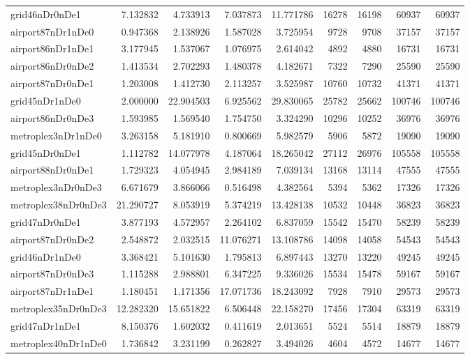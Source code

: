\begin{longtable}{|l|r|r|r|r|r|r|r|r|}
grid46nDr0nDe1 & 7.132832 & 4.733913 & 7.037873 & 11.771786 & 16278 & 16198 & 60937 & 60937 \\
airport87nDr1nDe0 & 0.947368 & 2.138926 & 1.587028 & 3.725954 & 9728 & 9708 & 37157 & 37157 \\
airport86nDr1nDe1 & 3.177945 & 1.537067 & 1.076975 & 2.614042 & 4892 & 4880 & 16731 & 16731 \\
airport86nDr0nDe2 & 1.413534 & 2.702293 & 1.480378 & 4.182671 & 7322 & 7290 & 25590 & 25590 \\
airport87nDr0nDe1 & 1.203008 & 1.412730 & 2.113257 & 3.525987 & 10760 & 10732 & 41371 & 41371 \\
grid45nDr1nDe0 & 2.000000 & 22.904503 & 6.925562 & 29.830065 & 25782 & 25662 & 100746 & 100746 \\
airport86nDr0nDe3 & 1.593985 & 1.569540 & 1.754750 & 3.324290 & 10296 & 10252 & 36976 & 36976 \\
metroplex3nDr1nDe0 & 3.263158 & 5.181910 & 0.800669 & 5.982579 & 5906 & 5872 & 19090 & 19090 \\
grid45nDr0nDe1 & 1.112782 & 14.077978 & 4.187064 & 18.265042 & 27112 & 26976 & 105558 & 105558 \\
airport88nDr0nDe1 & 1.729323 & 4.054945 & 2.984189 & 7.039134 & 13168 & 13114 & 47555 & 47555 \\
metroplex3nDr0nDe3 & 6.671679 & 3.866066 & 0.516498 & 4.382564 & 5394 & 5362 & 17326 & 17326 \\
metroplex38nDr0nDe3 & 21.290727 & 8.053919 & 5.374219 & 13.428138 & 10532 & 10448 & 36823 & 36823 \\
grid47nDr0nDe1 & 3.877193 & 4.572957 & 2.264102 & 6.837059 & 15542 & 15470 & 58239 & 58239 \\
airport87nDr0nDe2 & 2.548872 & 2.032515 & 11.076271 & 13.108786 & 14098 & 14058 & 54543 & 54543 \\
grid46nDr1nDe0 & 3.368421 & 5.101630 & 1.795813 & 6.897443 & 13270 & 13220 & 49245 & 49245 \\
airport87nDr0nDe3 & 1.115288 & 2.988801 & 6.347225 & 9.336026 & 15534 & 15478 & 59167 & 59167 \\
airport87nDr1nDe1 & 1.180451 & 1.171356 & 17.071736 & 18.243092 & 7928 & 7910 & 29573 & 29573 \\
metroplex35nDr0nDe3 & 12.282320 & 15.651822 & 6.506448 & 22.158270 & 17456 & 17304 & 63319 & 63319 \\
grid47nDr1nDe1 & 8.150376 & 1.602032 & 0.411619 & 2.013651 & 5524 & 5514 & 18879 & 18879 \\
metroplex40nDr1nDe0 & 1.736842 & 3.231199 & 0.262827 & 3.494026 & 4604 & 4572 & 14677 & 14677 \\

\end{longtable}
